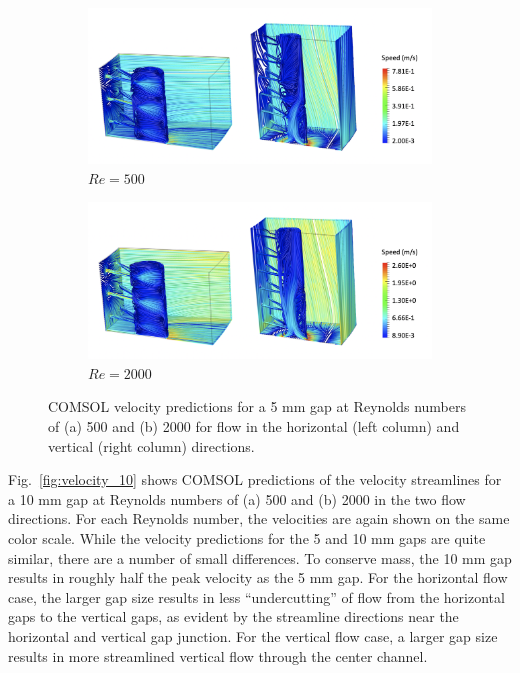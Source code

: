 \begin{figure}[!htb]
\centering
\begin{subfigure}{\textwidth}
  \centering
  \includegraphics[width=0.8\linewidth]{figs/Re500_cm05_U.png}
  \caption{\(Re=500\)}
\end{subfigure}
\begin{subfigure}{\textwidth}
  \centering
  \includegraphics[width=0.8\linewidth]{figs/Re2000_cm05_U.png}
  \caption{\(Re=2000\)}
\end{subfigure}
\caption{COMSOL velocity predictions for a 5 \si{\milli\meter} gap at Reynolds numbers of (a) 500 and (b) 2000 for flow in the horizontal (left column) and vertical (right column) directions.}
\label{fig:velocity_5}
\end{figure}

Fig.\ \ref{fig:velocity_10} shows COMSOL predictions of the velocity streamlines for a 10 \si{\milli\meter} gap at Reynolds numbers of (a) 500 and (b) 2000 in the two flow directions. For each Reynolds number, the velocities are again shown on the same color scale. While the velocity predictions for the 5 and 10 \si{\milli\meter} gaps are quite similar, there are a number of small differences. To conserve mass, the 10 \si{\milli\meter} gap results in roughly half the peak velocity as the 5 \si{\milli\meter} gap. For the horizontal flow case, the larger gap size results in less ``undercutting'' of flow from the horizontal gaps to the vertical gaps, as evident by the streamline directions near the horizontal and vertical gap junction. For the vertical flow case, a larger gap size results in more streamlined vertical flow through the center channel.


